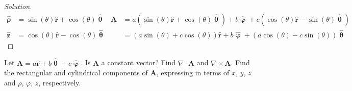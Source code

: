 \begin{proof}[Solution]
\begin{align*}
                    \hat{\boldsymbol{\uprho}}
                    &=\sin(\theta)\hat{\mathbf{r}}
                    +\cos(\theta)\hat{\boldsymbol{\uptheta}}
                    &\mathbf{A}
                    &=a(\sin(\theta)\hat{\mathbf{r}}
                    +\cos(\theta)\hat{\boldsymbol{\uptheta}})
                    +b\hat{\boldsymbol{\upvarphi}}
                    +c(\cos(\theta)\hat{\mathbf{r}}
                    -\sin(\theta)\hat{\boldsymbol{\uptheta}})\\
                    \hat{\mathbf{z}}
                    &=\cos(\theta)\hat{\mathbf{r}}
                    -\cos(\theta)\hat{\boldsymbol{\uptheta}}
                    &
                    &=(a\sin(\theta)
                    +c\cos(\theta))\hat{\mathbf{r}}
                    +b\hat{\boldsymbol{\upvarphi}}
                    +(a\cos(\theta)-c\sin(\theta))
                    \hat{\boldsymbol{\uptheta}}
                \end{align*}
            \end{proof}
            \begin{problem}[Wangsness 1-20]
                Let
                $\mathbf{A}%
                 =a\hat{\mathbf{r}}%
                 +b\hat{\boldsymbol{\uptheta}}%
                 +c\hat{\boldsymbol{\upvarphi}}$.
                Is $\mathbf{A}$ a constant vector? Find
                $\nabla\cdot\mathbf{A}$ and
                $\nabla\times\mathbf{A}$. Find the rectangular
                and cylindrical components of $\mathbf{A}$,
                expressing in terms of $x$, $y$, $z$ and
                $\rho$, $\varphi$, $z$, respectively.
            \end{problem}
